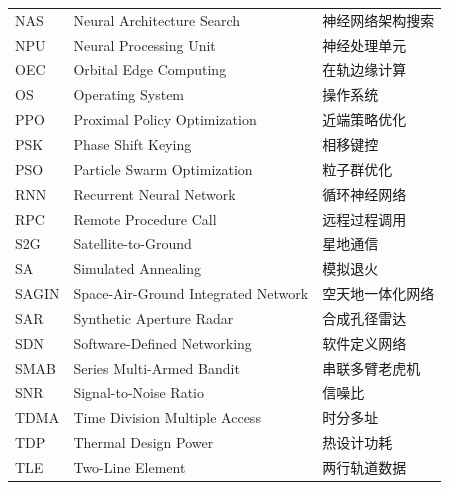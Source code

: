 {\begin{longtable}{p{} p{} p{}}
    NAS & Neural Architecture Search & 神经网络架构搜索 \\ 
    NPU & Neural Processing Unit & 神经处理单元 \\ 
    OEC & Orbital Edge Computing & 在轨边缘计算 \\ 
    OS & Operating System & 操作系统 \\ 
    PPO & Proximal Policy Optimization & 近端策略优化 \\ 
    PSK & Phase Shift Keying & 相移键控 \\ 
    PSO & Particle Swarm Optimization & 粒子群优化 \\ 
    RNN & Recurrent Neural Network & 循环神经网络 \\ 
    RPC & Remote Procedure Call & 远程过程调用 \\ 
    S2G & Satellite-to-Ground & 星地通信 \\ 
    SA & Simulated Annealing & 模拟退火 \\ 
    SAGIN & Space-Air-Ground Integrated Network & 空天地一体化网络 \\ 
    SAR & Synthetic Aperture Radar & 合成孔径雷达 \\ 
    SDN & Software-Defined Networking & 软件定义网络 \\ 
    SMAB & Series Multi-Armed Bandit & 串联多臂老虎机 \\ 
    SNR & Signal-to-Noise Ratio & 信噪比 \\ 
    TDMA & Time Division Multiple Access & 时分多址 \\ 
    TDP & Thermal Design Power & 热设计功耗 \\ 
    TLE & Two-Line Element & 两行轨道数据 \\ 
    
\end{longtable}


}